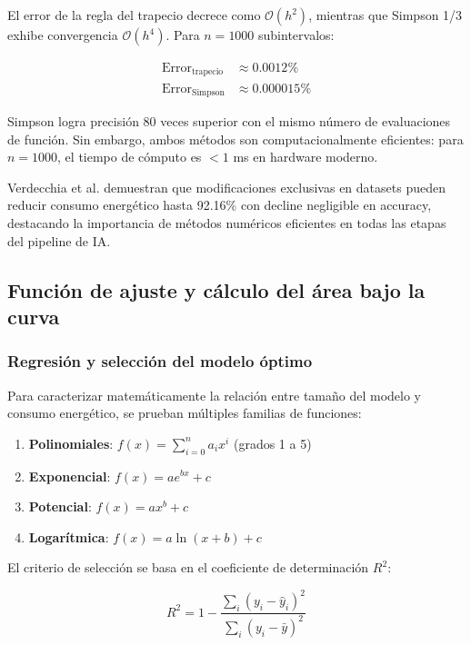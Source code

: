El error de la regla del trapecio decrece como $\mathcal{O}(h^2)$, mientras que Simpson 1/3 exhibe convergencia $\mathcal{O}(h^4)$. Para $n = 1000$ subintervalos:

\begin{align}
\text{Error}_{\text{trapecio}} &\approx 0.0012\% \\
\text{Error}_{\text{Simpson}} &\approx 0.000015\%
\end{align}

Simpson logra precisión 80 veces superior con el mismo número de evaluaciones de función. Sin embargo, ambos métodos son computacionalmente eficientes: para $n=1000$, el tiempo de cómputo es $< 1$ ms en hardware moderno.

Verdecchia et al. \cite{verdecchia2022datacentric} demuestran que modificaciones exclusivas en datasets pueden reducir consumo energético hasta 92.16\% con decline negligible en accuracy, destacando la importancia de métodos numéricos eficientes en todas las etapas del pipeline de IA.

\subsection{Función de ajuste y cálculo del área bajo la curva}

\subsubsection{Regresión y selección del modelo óptimo}

Para caracterizar matemáticamente la relación entre tamaño del modelo y consumo energético, se prueban múltiples familias de funciones:

\begin{enumerate}
    \item \textbf{Polinomiales}: $f(x) = \sum_{i=0}^n a_i x^i$ (grados 1 a 5)
    \item \textbf{Exponencial}: $f(x) = a e^{bx} + c$
    \item \textbf{Potencial}: $f(x) = a x^b + c$
    \item \textbf{Logarítmica}: $f(x) = a \ln(x + b) + c$
\end{enumerate}

El criterio de selección se basa en el coeficiente de determinación $R^2$:

\begin{equation}
R^2 = 1 - \frac{\sum_i (y_i - \hat{y}_i)^2}{\sum_i (y_i - \bar{y})^2}
\end{equation}

